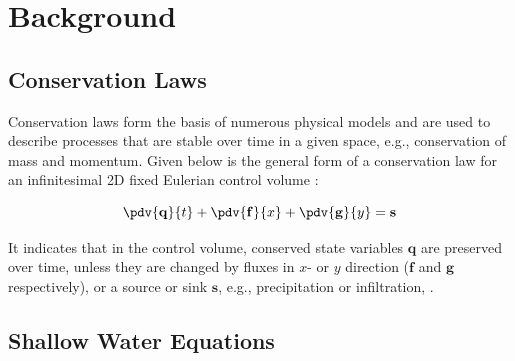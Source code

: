 \section{Background}\label{sec:background}

\subsection{Conservation Laws}\label{sec:conservation_laws}

Conservation laws form the basis of numerous physical models and are used to describe processes that are stable over time in a given space, e.g., conservation of mass and momentum.
Given below is
the general form of a conservation law for an infinitesimal \gls{2D} fixed Eulerian control volume \autocite{simons2020}:

\begin{equation}\label{eq:general-cl}
	\pdv{\mathbf{q}}{t} + \pdv{\mathbf{f}}{x}  + \pdv{\mathbf{g}}{y} = \mathbf{s}
\end{equation}

It indicates that in the control volume, conserved state variables $\mathbf{q}$ are preserved over time, unless they are changed by fluxes in $x$- or $y$ direction ($\mathbf{f}$ and $\mathbf{g}$ respectively), or a source or sink $\mathbf{s}$, e.g.,  precipitation or infiltration, \autocite{simons2020}.


\subsection{Shallow Water Equations}\label{sec:swe}

